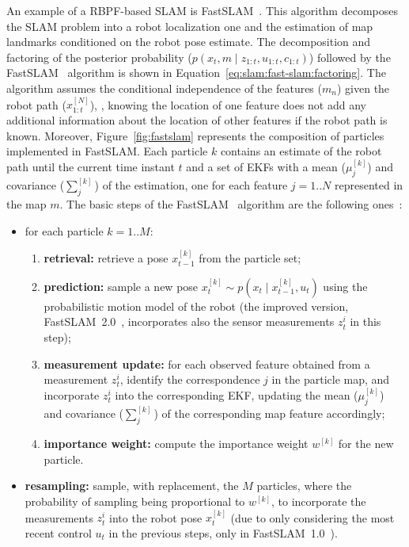 An example of a \gls{RBPF}-based \gls{SLAM} is FastSLAM~\cite{slam:pf:fastslam-1.0,slam:pf:fastslam-2.0}. This algorithm decomposes the \gls{SLAM} problem into a robot localization one and the estimation of map landmarks conditioned on the robot pose estimate. The decomposition and factoring of the posterior probability ($p\left(x_t,m \;\vert\; z_{1:t},u_{1:t},c_{1:t}\right)$) followed by the FastSLAM~\cite{slam:pf:fastslam-1.0,slam:pf:fastslam-2.0} algorithm is shown in Equation~\ref{eq:slam:fast-slam:factoring}. The algorithm assumes the conditional independence of the features ($m_n$) given the robot path ($x_{1:t}^{\left[N\right]}$), \ie, knowing the location of one feature does not add any additional information about the location of other features if the robot path is known.
Moreover, Figure~\ref{fig:fastslam} represents the composition of particles implemented in FastSLAM. Each particle $k$ contains an estimate of the robot path until the current time instant $t$ and a set of \glspl{EKF} with a mean ($\mu_j^{\left[k\right]}$) and covariance ($\sum_j^{\left[k\right]}$) of the estimation, one for each feature $j=1..N$ represented in the map $m$.
The basic steps of the FastSLAM~\cite{slam:pf:fastslam-1.0,slam:pf:fastslam-2.0} algorithm are the following ones~\cite{book:probabilistic-robotics}:

\begin{itemize}[nosep]
\item for each particle $k=1..M$:
  \begin{enumerate}[nosep]
  \item \textbf{retrieval:} retrieve a pose $x_{t-1}^{\left[k\right]}$ from the particle set;
  \item \textbf{prediction:} sample a new pose $x_{t}^{\left[k\right]} \sim p\left(x_t \;\vert\; x_{t-1}^{\left[k\right]},u_t\right)$ using the probabilistic motion model of the robot (the improved version, FastSLAM~2.0~\cite{slam:pf:fastslam-2.0}, incorporates also the sensor measurements $z_t^i$ in this step);
  \item \textbf{measurement update:} for each observed feature obtained from a measurement $z_t^i$, identify the correspondence $j$ in the particle map, and incorporate $z_t^i$ into the corresponding \gls{EKF}, updating the mean ($\mu_j^{\left[k\right]}$) and covariance ($\sum_j^{\left[k\right]}$) of the corresponding map feature accordingly;
  \item \textbf{importance weight:} compute the importance weight $w^{\left[k\right]}$ for the new particle.
  \end{enumerate}
\item \textbf{resampling:} sample, with replacement, the $M$ particles, where the probability of sampling being proportional to $w^{\left[k\right]}$, to incorporate the measurements $z_t^i$ into the robot pose $x_{t}^{\left[k\right]}$ (due to only considering the most recent control $u_t$ in the previous steps, only in FastSLAM~1.0~\cite{slam:pf:fastslam-1.0}).
\end{itemize}

